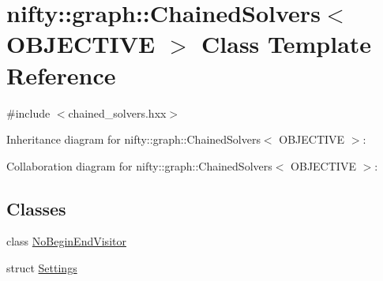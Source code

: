 \hypertarget{classnifty_1_1graph_1_1ChainedSolvers}{}\section{nifty\+:\+:graph\+:\+:Chained\+Solvers$<$ O\+B\+J\+E\+C\+T\+I\+V\+E $>$ Class Template Reference}
\label{classnifty_1_1graph_1_1ChainedSolvers}


{\ttfamily \#include $<$chained\+\_\+solvers.\+hxx$>$}



Inheritance diagram for nifty\+:\+:graph\+:\+:Chained\+Solvers$<$ O\+B\+J\+E\+C\+T\+I\+V\+E $>$\+:


Collaboration diagram for nifty\+:\+:graph\+:\+:Chained\+Solvers$<$ O\+B\+J\+E\+C\+T\+I\+V\+E $>$\+:
\subsection*{Classes}
\begin{DoxyCompactItemize}
\item 
class \hyperlink{classnifty_1_1graph_1_1ChainedSolvers_1_1NoBeginEndVisitor}{No\+Begin\+End\+Visitor}
\item 
struct \hyperlink{structnifty_1_1graph_1_1ChainedSolvers_1_1Settings}{Settings}
\end{DoxyCompactItemize}
